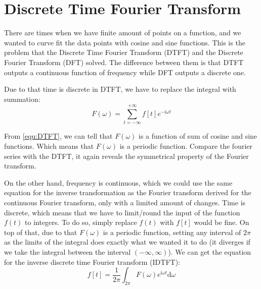 \section{Discrete Time Fourier Transform}
There are times when we have finite amount of points on a function, 
and we wanted to curve fit the data points with cosine and sine functions.
This is the problem that the Discrete Time Fourier Transform (DTFT) and the Discrete Fourier Transform (DFT) solved. 
The difference between them is that DTFT outputs a continuous function of frequency while DFT outputs a discrete one. 

Due to that time is discrete in DTFT, we have to replace the integral with summation: 
\begin{equation}
    F(\omega) = \sum_{t=-\infty}^{+\infty} f[t] e^{-\mathrm{i}\omega t} 
    \label{equ:DTFT}
\end{equation}

From \eqref{equ:DTFT}, we can tell that $F(\omega)$ is a function of sum of cosine and sine functions. 
Which means that $F(\omega)$ is a periodic function. 
Compare the fourier series with the DTFT, it again reveals the symmetrical property of the Fourier transform. 

On the other hand, frequency is continuous, which we could use the same equation for 
the inverse transformation as the Fourier transform derived for the continuous Fourier transform, 
only with a limited amount of changes. 
Time is discrete, which means that we have to limit/round the input of the function $f(t)$ to integers. 
To do so, simply replace $f(t)$ with $f[t]$ would be fine. 
On top of that, due to that $F(\omega)$ is a periodic function, 
setting any interval of $2\pi$ as the limits of the integral does exactly what we wanted it to do 
(it diverges if we take the integral between the interval $(-\infty,\infty)$). 
We can get the equation for 
the inverse discrete time Fourier transform (IDTFT):
\begin{equation}
    f[t] = \frac{1}{2\pi} \int_{2\pi} F(\omega) e^{\mathrm{i}\omega t} \mathrm{d}\omega
    \label{equ:IDTFT}
\end{equation}
